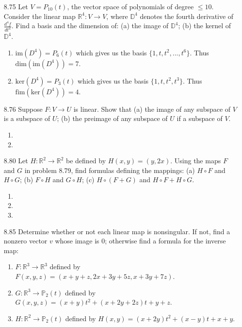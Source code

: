 \documentclass[12pt]{article}
\theoremstyle{definition}
\theoremstyle{plain}
\begin{document}
\begin{enumerate}
\item[8.75] Let $V=P_{10}(t)$, the vector space of polynomials of degree $\leq 10$. Consider the linear map $\mathbb{R}^4: V\rightarrow V$, where $\mathbb{D}^4$ denotes the fourth derivative of $\frac{d^4f}{dt^4}$. Find a basis and the dimension of: (a) the image of $\mathbb{D}^4$; (b) the kernel of $\mathbb{D}^4$.
	\begin{enumerate}
	\item $\mathrm{im}(D^4) = P_6(t)$ which gives us the basis $\{1,t,t^2,...,t^6\}$. Thus $\mathrm{dim}(\mathrm{im}(D^4))=7$.
	\item $\mathrm{ker}(D^4)=P_3(t)$ which gives us the basis $\{1,t,t^2,t^3\}$. Thus $\mathrm{fim}(\mathrm{ker}(D^4))=4$.
	\end{enumerate}		

\item[8.76] Suppose $F:V\rightarrow U$ is linear. Show that (a) the image of any subspace of $V$ is a subspace of $U$; (b) the preimage of any subspace of $U$ if a subspace of $V$.
	\begin{enumerate}
	\item
	\item
	\end{enumerate}

\item[8.80] Let $H:\mathbb{R}^2\rightarrow\mathbb{R}^2$ be defined by $H(x,y)=(y,2x)$. Using the maps $F$ and $G$ in problem 8.79, find formulas defining the mappings: (a) $H\circ F$ and $H\circ G$; (b) $F\circ H$ and $G\circ H$; (c) $H\circ(F+G)$ and $H\circ F + H\circ G$.
	\begin{enumerate}
	\item
	\item
	\item
	\end{enumerate}
	
\item[8.85] Determine whether or not each linear map is nonsingular. If not, find a nonzero vector $v$ whose image is 0; otherwise find a formula for the inverse map:
	\begin{enumerate}
	\item $F:\mathbb{R}^3\rightarrow\mathbb{R}^3$ defined by $F(x,y,z)=(x+y+z,2x+3y+5z,x+3y+7z)$.
	\item $G:\mathbb{R}^3\rightarrow\mathbb{P}_2(t)$ defined by $G(x,y,z)=(x+y)t^2+(x+2y+2z)t+y+z$.
	\item $H:\mathbb{R}^2\rightarrow\mathbb{P}_2(t)$ defined by $H(x,y)=(x+2y)t^2+(x-y)t+x+y$.
	\end{enumerate}


\end{enumerate}
\end{document}
